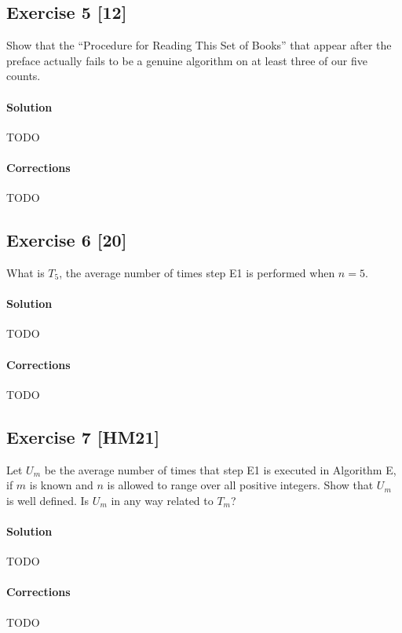 \documentclass{report}
\newcommand{\say}[1]{``#1''}
\begin{document}
		
		\subsection*{Exercise 5 [12]} 
		
			Show that the \say{Procedure for Reading This Set of Books} that appear after the preface actually fails to be a genuine algorithm on at least three of our five counts.
			
			\paragraph{Solution} TODO
			
			\paragraph{Corrections} TODO
			
		
		\subsection*{Exercise 6 [20]}
		
			What is $T_5$, the average number of times step E1 is performed when $n=5$.
			
			\paragraph{Solution} TODO
			
			\paragraph{Corrections} TODO
			
		
		\subsection*{Exercise 7 [HM21]} 
		
			Let $U_m$ be the average number of times that step E1 is executed in Algorithm E, if $m$ is known and $n$ is allowed to range over all positive integers. Show that $U_m$ is well defined. Is $U_m$ in any way related to $T_m$?
			
			\paragraph{Solution} TODO
			
			\paragraph{Corrections} TODO
			
\end{document}
